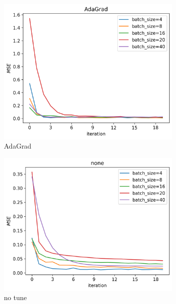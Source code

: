 \documentclass[11pt]{article}
\begin{document}
\begin{figure}[H]
  \begin{subfigure}{.5\textwidth}
    \centering
    \includegraphics[width=.9\textwidth]{../figures/SGD_batch_size_AdaGrad.png}
    \caption{AdaGrad}
    \label{fig:}
  \end{subfigure}
  \begin{subfigure}{.5\textwidth}
    \centering
    \includegraphics[width=.9\textwidth]{../figures/SGD_batch_size_none.png}
    \caption{no tune}
    \label{fig:}
  \end{subfigure}
  \begin{subfigure}{.5\textwidth}
    \centering

\end{subfigure}
\end{figure}
\end{document}
